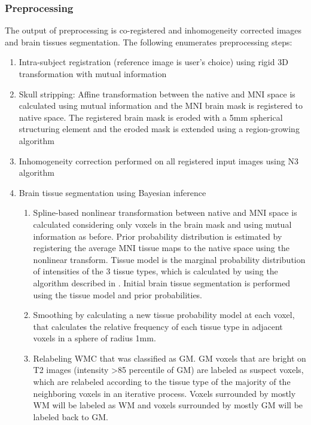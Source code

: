 \subsubsection{Preprocessing}
The output of preprocessing is co-registered and inhomogeneity corrected images and brain tissues segmentation. The following enumerates preprocessing steps:
\begin{enumerate}
\item Intra-subject registration (reference image is user’s choice) using rigid 3D transformation with mutual information
\item Skull stripping: Affine transformation between the native and MNI space is calculated using mutual information and the MNI brain mask is registered to native space. The registered brain mask is eroded with a 5mm spherical structuring element and the eroded mask is extended using a region-growing algorithm
\item Inhomogeneity correction performed on all registered input images using N3 algorithm \cite{N3}
\item Brain tissue segmentation using Bayesian inference
    \begin{enumerate}
    \item Spline-based nonlinear transformation between native and MNI space is calculated considering only voxels in the brain mask and using mutual information as before. Prior probability distribution is estimated by registering the average MNI tissue maps to the native space using the nonlinear transform. Tissue model is the marginal probability distribution of intensities of the 3 tissue types, which is calculated by using the algorithm described in \cite{EM_Empirical}. Initial brain tissue segmentation is performed using the tissue model and prior probabilities.
    \item Smoothing by calculating a new tissue probability model at each voxel, that calculates the relative frequency of each tissue type in adjacent voxels in a sphere of radius 1mm.
    \item Relabeling WMC that was classified as GM. GM voxels that are bright on T2 images (intensity >85 percentile of GM) are labeled as suspect voxels, which are relabeled according to the tissue type of the majority of the neighboring voxels in an iterative process. Voxels surrounded by mostly WM will be labeled as WM and voxels surrounded by mostly GM will be labeled back to GM.
    \end{enumerate}
\end{enumerate}
  
  
  